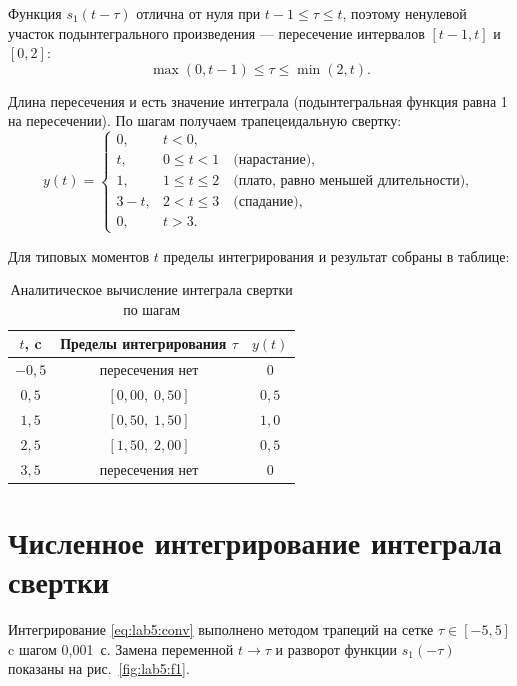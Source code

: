 Функция $s_1(t - \tau)$ отлична от нуля при $t - 1 \le \tau \le t$, поэтому ненулевой участок подынтегрального произведения --- пересечение интервалов $[t-1, t]$ и $[0, 2]$:
\begin{equation}
    \max(0, t-1) \le \tau \le \min(2, t).
\end{equation}

Длина пересечения и есть значение интеграла (подынтегральная функция равна 1 на пересечении). По шагам получаем трапецеидальную свертку:
\begin{equation}
    y(t) =
    \begin{cases}
        0, & t < 0, \\
        t, & 0 \le t < 1 \quad \text{(нарастание)}, \\
        1, & 1 \le t \le 2 \quad \text{(плато, равно меньшей длительности)}, \\
        3 - t, & 2 < t \le 3 \quad \text{(спадание)}, \\
        0, & t > 3.
    \end{cases}
    \label{eq:lab5:trapezoid}
\end{equation}

Для типовых моментов $t$ пределы интегрирования и результат собраны в таблице:

\begin{table}[H]
    \caption{Аналитическое вычисление интеграла свертки по шагам}
    \centering
    \begin{tabular}{ccc}
        \toprule
        $t$, c & Пределы интегрирования $\tau$ & $y(t)$ \\
        \midrule
        $-0{,}5$ & пересечения нет & $0$ \\
        $0{,}5$  & $[0{,}00,\; 0{,}50]$ & $0{,}5$ \\
        $1{,}5$  & $[0{,}50,\; 1{,}50]$ & $1{,}0$ \\
        $2{,}5$  & $[1{,}50,\; 2{,}00]$ & $0{,}5$ \\
        $3{,}5$  & пересечения нет & $0$ \\
        \bottomrule
    \end{tabular}
\end{table}

\section{Численное интегрирование интеграла свертки}

Интегрирование \eqref{eq:lab5:conv} выполнено методом трапеций на сетке $\tau \in [-5, 5]$ c шагом 0{,}001~с. Замена переменной $t \to \tau$ и разворот функции $s_1(-\tau)$ показаны на рис.~\ref{fig:lab5:f1}.

